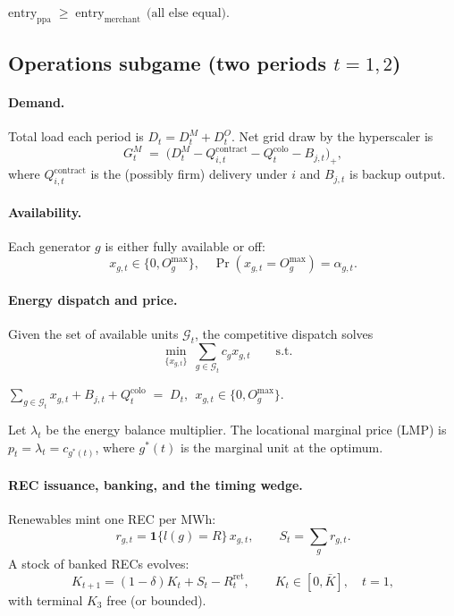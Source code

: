 \documentclass[a4paper,fleqn,longmktitle]{cas-sc}
\begin{document}
\begin{center}
    $\text{entry}_{\text{ppa}} \;\ge\; \text{entry}_{\text{merchant}}
\ \ \text{(all else equal).}$
\end{center}

\subsection{Operations subgame (two periods $t=1,2$)}

\paragraph{Demand.} Total load each period is $D_t=D^M_t+D^O_t$. Net grid draw by the hyperscaler is
\begin{equation}
\label{eq:grid_draw}
G^M_{t} \;=\; \big(D^M_t - Q^{\text{contract}}_{i,t} - Q^{\text{colo}}_t - B_{j,t}\big)_+,
\end{equation}
where $Q^{\text{contract}}_{i,t}$ is the (possibly firm) delivery under $i$ and $B_{j,t}$ is backup output.

\paragraph{Availability.} Each generator $g$ is either fully available or off:
\begin{equation}
x_{g,t}\in\{0,O_g^{\max}\},\quad \Pr(x_{g,t}=O_g^{\max})=\alpha_{g,t}.
\end{equation}

\paragraph{Energy dispatch and price.} Given the set of available units $\mathcal G_t$, the competitive dispatch solves
\begin{equation}
\label{eq:dispatch}
\min_{\{x_{g,t}\}} \ \sum_{g\in\mathcal G_t} c_g x_{g,t} \qquad
\text{s.t.}\quad 
\end{equation}
\begin{center}
    $\sum_{g\in\mathcal G_t} x_{g,t} + B_{j,t} + Q^{\text{colo}}_t \;=\; D_t,\ \ x_{g,t}\in\{0,O_g^{\max}\}.$
\end{center}
Let $\lambda_t$ be the energy balance multiplier. The locational marginal price (LMP) is $p_t=\lambda_t=c_{g^*(t)}$, where $g^*(t)$ is the marginal unit at the optimum.

\paragraph{REC issuance, banking, and the timing wedge.}
Renewables mint one REC per MWh:
\begin{equation}
r_{g,t}=\mathbf 1\{l(g)=R\}\,x_{g,t},\qquad S_t=\sum_g r_{g,t}.
\end{equation}
A stock of banked RECs evolves:
\begin{equation}
\label{eq:bank}
K_{t+1}=(1-\delta)K_t+S_t - R^{\text{ret}}_t,\qquad K_t\in[0,\bar K],\quad t=1,
\end{equation}
with terminal $K_3$ free (or bounded).
\end{document}
